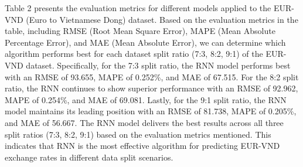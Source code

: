 \documentclass{ieeeojies}
\begin{document}
Table 2 presents the evaluation metrics for different models applied to the EUR-VND (Euro to Vietnamese Dong) dataset. Based on the evaluation metrics in the table, including RMSE (Root Mean Square Error), MAPE (Mean Absolute Percentage Error), and MAE (Mean Absolute Error), we can determine which algorithm performs best for each dataset split ratio (7:3, 8:2, 9:1) of the EUR-VND dataset. Specifically, for the 7:3 split ratio, the RNN model performs best with an RMSE of 93.655, MAPE of 0.252\%, and MAE of 67.515. For the 8:2 split ratio, the RNN continues to show superior performance with an RMSE of 92.962, MAPE of 0.254\%, and MAE of 69.081. Lastly, for the 9:1 split ratio, the RNN model maintains its leading position with an RMSE of 81.738, MAPE of 0.205\%, and MAE of 56.667. The RNN model delivers the best results across all three split ratios (7:3, 8:2, 9:1) based on the evaluation metrics mentioned. This indicates that RNN is the most effective algorithm for predicting EUR-VND exchange rates in different data split scenarios.
\end{document}
